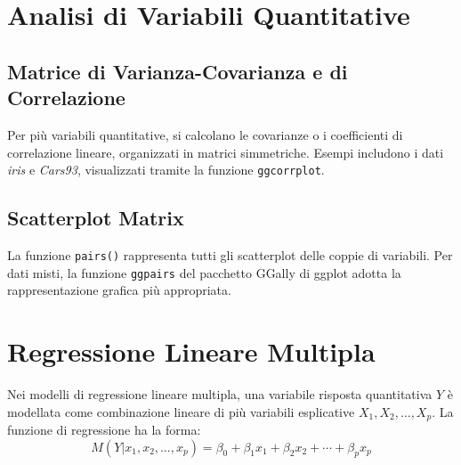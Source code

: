 \documentclass{article}
\begin{document}
\section{Analisi di Variabili Quantitative}
\subsection{Matrice di Varianza-Covarianza e di Correlazione}
Per più variabili quantitative, si calcolano le covarianze o i coefficienti di correlazione lineare, organizzati in matrici simmetriche. Esempi includono i dati \textit{iris} e \textit{Cars93}, visualizzati tramite la funzione \texttt{ggcorrplot}.

\subsection{Scatterplot Matrix}
La funzione \texttt{pairs()} rappresenta tutti gli scatterplot delle coppie di variabili. Per dati misti, la funzione \texttt{ggpairs} del pacchetto GGally di ggplot adotta la rappresentazione grafica più appropriata.

\section{Regressione Lineare Multipla}
Nei modelli di regressione lineare multipla, una variabile risposta quantitativa \( Y \) è modellata come combinazione lineare di più variabili esplicative \( X_1, X_2, \ldots, X_p \). La funzione di regressione ha la forma:
\[ M(Y | x_1, x_2, \ldots, x_p) = \beta_0 + \beta_1 x_1 + \beta_2 x_2 + \cdots + \beta_p x_p \]
\end{document}
